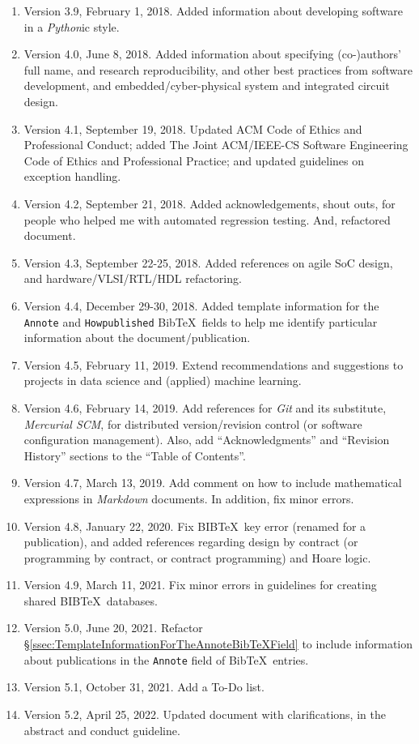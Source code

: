 \documentclass[letter,12pt]{article}
\begin{document}
\begin{enumerate}
\item Version 3.9, February 1, 2018. Added information about developing software in a {\it Python}ic style.
\item Version 4.0, June 8, 2018. Added information about specifying (co-)authors' full name, and research reproducibility, and other best practices from software development, and embedded/cyber-physical system and integrated circuit design.
\item Version 4.1, September 19, 2018. Updated ACM Code of Ethics and Professional Conduct; added The Joint {ACM/IEEE-CS} Software Engineering Code of Ethics and Professional Practice; and updated guidelines on exception handling.
\item Version 4.2, September 21, 2018. Added acknowledgements, shout outs, for people who helped me with automated regression testing. And, refactored document.
\item Version 4.3, September 22-25, 2018. Added references on agile SoC design, and hardware/VLSI/RTL/HDL refactoring.
\item Version 4.4, December 29-30, 2018. Added template information for the {\tt Annote} and {\tt Howpublished} {\sc Bib}\TeX\ fields to help me identify particular information about the document/publication.
\item Version 4.5, February 11, 2019. Extend recommendations and suggestions to projects in data science and (applied) machine learning.
\item Version 4.6, February 14, 2019. Add references for {\it Git} and its substitute, {\it Mercurial SCM}, for distributed version/revision control (or software configuration management). Also, add ``Acknowledgments'' and ``Revision History'' sections to the ``Table of Contents''.
\item Version 4.7, March 13, 2019. Add comment on how to include mathematical expressions in {\it Markdown} documents. In addition, fix minor errors.
\item Version 4.8, January 22, 2020. Fix B{\scriptsize IB}\TeX\ key error (renamed for a publication), and added references regarding design by contract (or programming by contract, or contract programming) and Hoare logic.
\item Version 4.9, March 11, 2021. Fix minor errors in guidelines for creating shared B{\scriptsize IB}\TeX\ databases.
\item Version 5.0, June 20, 2021. Refactor \S\ref{ssec:TemplateInformationForTheAnnoteBibTeXField} to include information about publications in the {\tt Annote} field of {\sc Bib}\TeX\ entries.
\item Version 5.1, October 31, 2021. Add a To-Do list.
\item Version 5.2, April 25, 2022. Updated document with clarifications, in the abstract and conduct guideline.
\end{enumerate}
\end{document}
